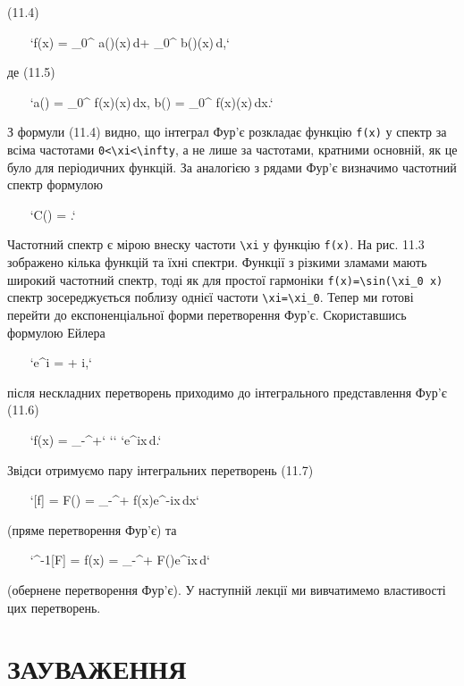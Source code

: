 \documentclass[
  ukrainian,
]{article}
\begin{document}
(11.4)

~~~
`f(x) = \int_{0}^{\infty} a(\xi)\cos(\xi x)\,d\xi + \int_{0}^{\infty} b(\xi)\sin(\xi x)\,d\xi,`
~~~

де (11.5)

~~~
`a(\xi) = \int_{0}^{\infty} f(x)\cos(\xi x)\,dx, \qquad b(\xi) = \int_{0}^{\infty} f(x)\sin(\xi x)\,dx.`
~~~

З формули (11.4) видно, що інтеграл Фур'є розкладає функцію
\texttt{f(x)} у спектр за всіма частотами
\texttt{0\textless{}\textbackslash{}xi\textless{}\textbackslash{}infty},
а не лише за частотами, кратними основній, як це було для періодичних
функцій. За аналогією з рядами Фур'є визначимо частотний спектр формулою

~~~
`C(\xi) = .`
~~~

Частотний спектр є мірою внеску частоти \texttt{\textbackslash{}xi} у
функцію \texttt{f(x)}. На рис. 11.3 зображено кілька функцій та їхні
спектри. Функції з різкими зламами мають широкий частотний спектр, тоді
як для простої гармоніки
\texttt{f(x)=\textbackslash{}sin(\textbackslash{}xi\_0\ x)} спектр
зосереджується поблизу однієї частоти
\texttt{\textbackslash{}xi=\textbackslash{}xi\_0}. Тепер ми готові
перейти до експоненціальної форми перетворення Фур'є. Скориставшись
формулою Ейлера

~~~
`e^{i\theta} = \cos\theta + i\sin\theta,`
~~~

після нескладних перетворень приходимо до інтегрального представлення
Фур'є (11.6)

~~~
`f(x) =  \int_{-\infty}^{+\infty}`
``
`e^{i\xi x}\,d\xi.`
~~~

Звідси отримуємо пару інтегральних перетворень (11.7)

~~~
`[f] = F(\xi) =  \int_{-\infty}^{+\infty} f(x)e^{-i\xi x}\,dx`
~~~

(пряме перетворення Фур'є) та

~~~
`^{-1}[F] = f(x) =  \int_{-\infty}^{+\infty} F(\xi)e^{i\xi x}\,d\xi`
~~~

(обернене перетворення Фур'є). У наступній лекції ми вивчатимемо
властивості цих перетворень.

\section{ЗАУВАЖЕННЯ}\label{ux437ux430ux443ux432ux430ux436ux435ux43dux43dux44f-5}
\end{document}
